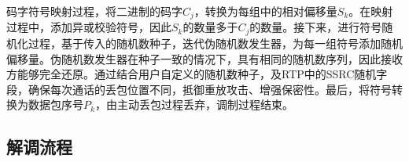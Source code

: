 码字符号映射过程，将二进制的码字$C_{j}$，转换为每组中的相对偏移量$S_{k}$。在映射过程中，添加异或校验符号，因此$S_{k}$的数量多于$C_{j}$的数量。接下来，进行符号随机化过程，基于传入的随机数种子，迭代伪随机数发生器，为每一组符号添加随机偏移量。伪随机数发生器在种子一致的情况下，具有相同的随机数序列，因此接收方能够完全还原。通过结合用户自定义的随机数种子，及RTP中的SSRC随机字段，确保每次通话的丢包位置不同，抵御重放攻击、增强保密性。最后，将符号转换为数据包序号$P_{k}$，由主动丢包过程丢弃，调制过程结束。

\subsection{解调流程}
\label{chap:hash:designation:demodulation}


